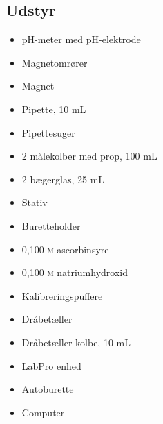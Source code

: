 \subsection*{Udstyr}
\begin{multicols}{2}
    \begin{itemize}
        \item pH-meter med pH-elektrode
        \item Magnetomrører
        \item Magnet
        \item Pipette, 10 mL
        \item Pipettesuger
        \item 2 målekolber med prop, 100 mL
        \item 2 bægerglas, 25 mL
        \item Stativ
        \item Buretteholder
        \item 0{,}100 \textsc{m} ascorbinsyre
        \item 0{,}100 \textsc{m} natriumhydroxid
        \item Kalibreringspuffere
        \item Dråbetæller
        \item Dråbetæller kolbe, 10 mL
        \item LabPro enhed
        \item Autoburette
        \item Computer
    \end{itemize}    
\end{multicols}
